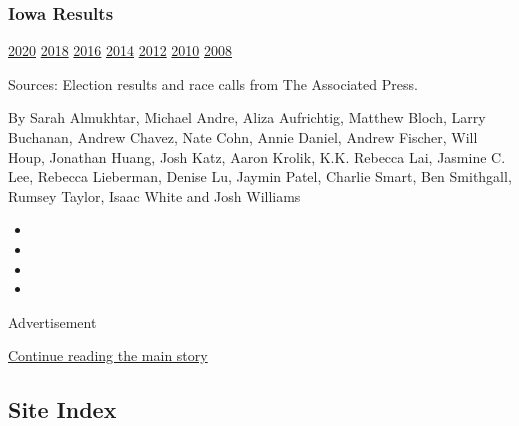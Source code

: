 \hypertarget{iowa-results}{%
\subsubsection{Iowa Results}\label{iowa-results}}

\href{https://www.nytimes3xbfgragh.onion/interactive/2020/02/04/us/elections/results-iowa-caucus.html?action=click\&module=ELEX_results\&pgtype=Interactive\&region=PastResultsFooter}{2020}
\href{https://www.nytimes3xbfgragh.onion/interactive/2018/11/06/us/elections/results-iowa-elections.html?action=click\&module=ELEX_results\&pgtype=Interactive\&region=PastResultsFooter}{2018}
\href{https://www.nytimes3xbfgragh.onion/elections/2016/results/iowa?action=click\&module=ELEX_results\&pgtype=Interactive\&region=PastResultsFooter}{2016}
\href{https://www.nytimes3xbfgragh.onion/elections/2014/iowa-elections?action=click\&module=ELEX_results\&pgtype=Interactive\&region=PastResultsFooter}{2014}
\href{https://www.nytimes3xbfgragh.onion/elections/2012/results/states/iowa.html?action=click\&module=ELEX_results\&pgtype=Interactive\&region=PastResultsFooter}{2012}
\href{https://www.nytimes3xbfgragh.onion/elections/2010/results/iowa.html?action=click\&module=ELEX_results\&pgtype=Interactive\&region=PastResultsFooter}{2010}
\href{https://www.nytimes3xbfgragh.onion/elections/2008/results/states/iowa.html?action=click\&module=ELEX_results\&pgtype=Interactive\&region=PastResultsFooter}{2008}

Sources: Election results and race calls from The Associated Press.

By Sarah Almukhtar, Michael Andre, Aliza Aufrichtig, Matthew Bloch,
Larry Buchanan, Andrew Chavez, Nate Cohn, Annie Daniel, Andrew Fischer,
Will Houp, Jonathan Huang, Josh Katz, Aaron Krolik, K.K. Rebecca Lai,
Jasmine C. Lee, Rebecca Lieberman, Denise Lu, Jaymin Patel, Charlie
Smart, Ben Smithgall, Rumsey Taylor, Isaac White and Josh Williams

\begin{itemize}
\item
\item
\item
\item
\end{itemize}

Advertisement

\protect\hyperlink{after-bottom}{Continue reading the main story}

\hypertarget{site-index}{%
\subsection{Site Index}\label{site-index}}

